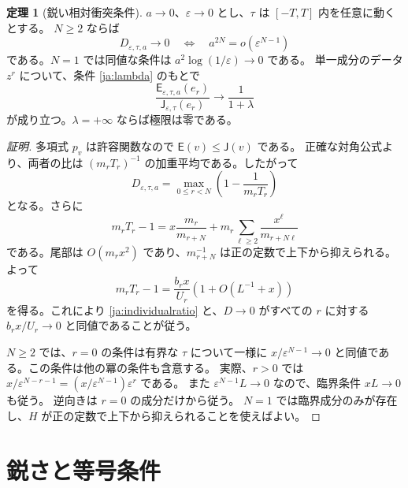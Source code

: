 \documentclass[12pt]{amsart}
\theoremstyle{definition}
\theoremstyle{remark}
\numberwithin{equation}{section}
\newcommand{\Cost}{\mathsf E}
\newcommand{\JetCost}{\mathsf J}
\theoremstyle{definition}
\newtheorem{jthm}[thm]{定理}
\begin{document}
\begin{jthm}[鋭い相対衝突条件]\label{ja:criterion}
$a\to0$、$\varepsilon\to0$ とし、$\tau$ は $[-T,T]$ 内を任意に動くとする。
$N\ge2$ ならば
\begin{equation}\label{ja:criterionN}
 D_{\varepsilon,\tau,a}\longrightarrow0
 \quad\Longleftrightarrow\quad
 a^{2N}=o(\varepsilon^{N-1})
\end{equation}
である。$N=1$ では同値な条件は $a^2\log(1/\varepsilon)\to0$ である。
単一成分のデータ $z^r$ について、条件 \eqref{ja:lambda} のもとで
\begin{equation}\label{ja:individualratio}
 \frac{\Cost_{\varepsilon,\tau,a}(e_r)}
 {\JetCost_{\varepsilon,\tau}(e_r)}
 \longrightarrow\frac{1}{1+\lambda}
\end{equation}
が成り立つ。$\lambda=+\infty$ ならば極限は零である。
\end{jthm}
\begin{proof}[証明]
多項式 $p_v$ は許容関数なので $\Cost(v)\le\JetCost(v)$ である。
正確な対角公式より、両者の比は $(m_rT_r)^{-1}$ の加重平均である。したがって
\begin{equation}\label{ja:exactdefect}
 D_{\varepsilon,\tau,a}
 =\max_{0\le r<N}\left(1-\frac1{m_rT_r}\right)
\end{equation}
となる。さらに
\[
 m_rT_r-1=x\frac{m_r}{m_{r+N}}
  +m_r\sum_{\ell\ge2}\frac{x^\ell}{m_{r+N\ell}}
\]
である。尾部は $O(m_rx^2)$ であり、$m_{r+N}^{-1}$ は正の定数で上下から抑えられる。よって
\begin{equation}\label{ja:jetlambda}
 m_rT_r-1=\frac{b_rx}{U_r}(1+O(L^{-1}+x))
\end{equation}
を得る。これにより \eqref{ja:individualratio} と、$D\to0$ がすべての $r$ に対する
$b_rx/U_r\to0$ と同値であることが従う。

$N\ge2$ では、$r=0$ の条件は有界な $\tau$ について一様に
$x/\varepsilon^{N-1}\to0$ と同値である。この条件は他の冪の条件も含意する。
実際、$r>0$ では $x/\varepsilon^{N-r-1}
=(x/\varepsilon^{N-1})\varepsilon^r$ である。
また $\varepsilon^{N-1}L\to0$ なので、臨界条件 $xL\to0$ も従う。
逆向きは $r=0$ の成分だけから従う。
$N=1$ では臨界成分のみが存在し、$H$ が正の定数で上下から抑えられることを使えばよい。
\end{proof}

\section{鋭さと等号条件}\label{ja:sharpsec}
\end{document}
